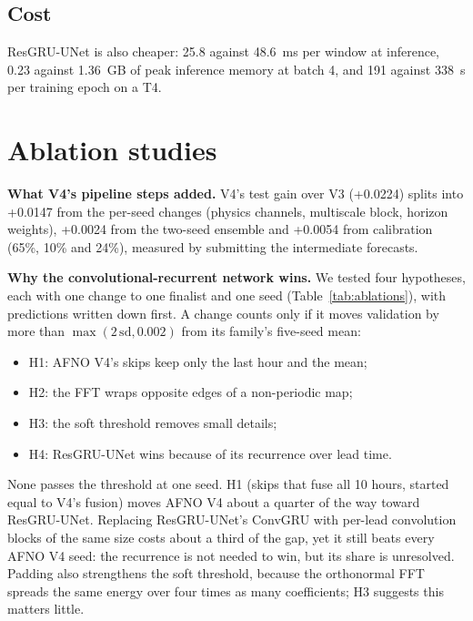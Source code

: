 \documentclass[conference]{IEEEtran}
\begin{document}
\subsection{Cost}
ResGRU-UNet is also cheaper: 25.8 against 48.6~ms per window at inference, 0.23 against 1.36~GB of peak inference memory at batch 4, and 191 against 338~s per training epoch on a T4.

\section{Ablation studies}
\label{sec:ablation}
\textbf{What V4's pipeline steps added.} V4's test gain over V3 (+0.0224) splits into +0.0147 from the per-seed changes (physics channels, multiscale block, horizon weights), +0.0024 from the two-seed ensemble and +0.0054 from calibration (65\%, 10\% and 24\%), measured by submitting the intermediate forecasts.

\textbf{Why the convolutional-recurrent network wins.} We tested four hypotheses, each with one change to one finalist and one seed (Table~\ref{tab:ablations}), with predictions written down first. A change counts only if it moves validation by more than $\max(2\,\mathrm{sd}, 0.002)$ from its family's five-seed mean:
\begin{itemize}
\item H1: AFNO V4's skips keep only the last hour and the mean;
\item H2: the FFT wraps opposite edges of a non-periodic map;
\item H3: the soft threshold removes small details;
\item H4: ResGRU-UNet wins because of its recurrence over lead time.
\end{itemize}
None passes the threshold at one seed. H1 (skips that fuse all 10 hours, started equal to V4's fusion) moves AFNO V4 about a quarter of the way toward ResGRU-UNet. Replacing ResGRU-UNet's ConvGRU with per-lead convolution blocks of the same size costs about a third of the gap, yet it still beats every AFNO V4 seed: the recurrence is not needed to win, but its share is unresolved. Padding also strengthens the soft threshold, because the orthonormal FFT spreads the same energy over four times as many coefficients; H3 suggests this matters little.
\end{document}
